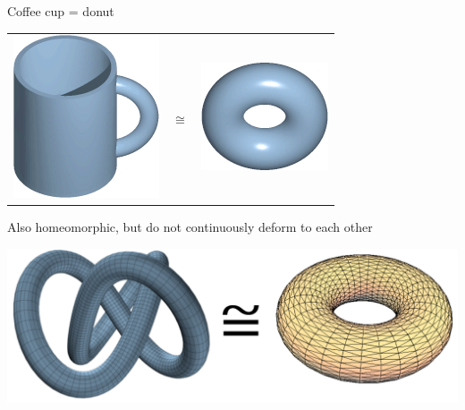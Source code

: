 \documentclass[10pt]{beamer}
\begin{document}
\begin{frame}{Coffee cup = donut}

\begin{center}
\begin{tabular}{M{2cm} M{1cm} M{1cm}}
  \includegraphics[scale = 0.4]{pictures/TorusMug/9ad666e1dab24639823928c242b3bdf0xmTjuhH4RRvOJNiC-0.png} & $\cong$ & \includegraphics[scale = 0.4]{pictures/TorusMug/9ad666e1dab24639823928c242b3bdf0xmTjuhH4RRvOJNiC-28.png} \\
\end{tabular}
\end{center}

\end{frame}

\begin{frame}{Also homeomorphic, but do not continuously deform to each other}

\begin{center}
\includegraphics[scale = 0.4]{pictures/KnottedTorus.pdf}
\end{center}

\end{frame}
\end{document}
